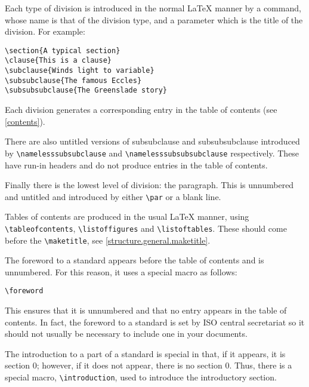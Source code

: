 Each type of division is introduced in the normal LaTeX manner by a command,
whose name is that of the division type, and a parameter which is the title of
the division. For example:
\begin{verbatim}
\section{A typical section}
\clause{This is a clause}
\subclause{Winds light to variable}
\subsubclause{The famous Eccles}
\subsubsubclause{The Greenslade story}
\end{verbatim}

Each division generates a corresponding entry in the table of contents
(see \ref{contents}).

There are also untitled versions of subsubclause and subsubsubclause
introduced by \verb|\namelesssubsubclause| and \verb|\namelesssubsubsubclause|
respectively.
These have run-in headers and do not produce entries in the table of
contents.

Finally there is the lowest level of division: the paragraph.
This is unnumbered and untitled and introduced by either \verb|\par|
or a blank line.

\label{contents}
Tables of contents are produced in the usual LaTeX manner, using
\verb|\tableofcontents|, \verb|\listoffigures| and
\verb|\listoftables|.
These should come before the \verb|\maketitle|, see
\ref{structure.general.maketitle}.

\label{special.foreword}
The foreword to a standard appears before the table of contents and is
unnumbered.
For this reason, it uses a special macro as follows:
\begin{verbatim}
\foreword
\end{verbatim}

This ensures that it is unnumbered and that no entry appears in the table
of contents.
In fact, the foreword to a standard is set by ISO central secretariat so
it should not usually be necessary to include one in your documents.

\label{special.intro}
The introduction to a part of a standard is special in that, if it appears,
it is section 0; however, if it does not appear, there is no section 0.
Thus, there is a special macro, \verb|\introduction|, used to introduce
the introductory section.

